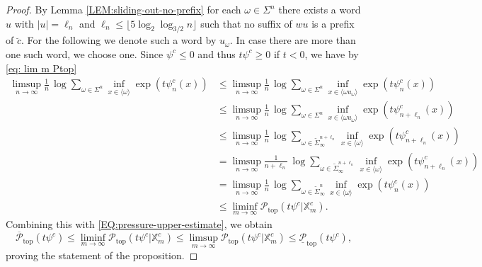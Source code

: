 \documentclass[11pt,reqno]{amsart}
\theoremstyle{plain}
\theoremstyle{definition}
\newcommand{\mc}{\mathcal}
\begin{document}
\begin{proof}
By Lemma \ref{LEM:sliding-out-no-prefix} 
for each $\omega\in \Sigma^n$ there exists a word $u$ with 
$|u|= \ell_n$ and $\ell_n\leqslant \lfloor  5 \log_2 \log_{3/2} n\rfloor$
such that no suffix of $wu$ is a prefix of $\breve{c}$. For the following we denote such a word by $u_{\omega}$. In case there are more than one such word, we choose one. 
Since $\psi^c\leqslant 0$ and thus $t\psi^c\geqslant 0$ if $t<0$, we have by \eqref{eq: lim m Ptop}
\begin{align*}
  \limsup_{n \to \infty} \frac{1}{n}\, \log \sum_{\omega\in \Sigma^{n}}\inf_{x\in  \langle\omega\rangle}\exp\left(t \psi_{n}^{c}(x)\right)
  &\leqslant \limsup_{n \to \infty} \frac{1}{n}\, \log \sum_{\omega\in \Sigma^{n}}\inf_{x\in  \langle\omega u_{\omega}\rangle}\exp\left(t \psi_{n}^{c}(x)\right) \\
  &\leqslant \limsup_{n \to \infty} \frac{1}{n}\, \log \sum_{\omega\in \Sigma^{n}}\inf_{x\in  \langle\omega u_{\omega}\rangle}\exp\left(t \psi_{n+\ell_n}^{c}(x)\right) \\
  &\leqslant \limsup_{n \to \infty} \frac{1}{n}\, \log \sum_{\omega\in \widetilde{\Sigma}_{\infty}^{n+\ell_n}}\inf_{x\in  \langle\omega \rangle}\exp\left(t \psi_{n+\ell_n}^{c}(x)\right) \\
  &= \limsup_{n \to \infty} \frac{1}{n+\ell_n}\, \log \sum_{\omega\in \widetilde{\Sigma}_{\infty}^{n+\ell_n}}\inf_{x\in  \langle\omega \rangle}\exp\left(t \psi_{n+\ell_n}^{c}(x)\right)\\
  &= \limsup_{n \to \infty} \frac{1}{n}\, \log \sum_{\omega\in \widetilde{\Sigma}_{\infty}^{n}}\inf_{x\in  \langle\omega \rangle}\exp\left(t \psi_{n}^{c}(x)\right)
  \\ &\leqslant \liminf_{m \to \infty} \mc P_{\operatorname{top}}(t \psi^c \vert \mathbb{X}_m^c).
\end{align*}
Combining this with \eqref{EQ:pressure-upper-estimate}, we obtain
\[
\overline{\mc P}_{\operatorname{top}}(t \psi^c)
\leqslant \liminf_{m \to \infty} \mc P_{\operatorname{top}}(t \psi^c | \mathbb{X}_m^c)
\leqslant \limsup_{m \to \infty} \mc P_{\operatorname{top}}(t \psi^c | \mathbb{X}_m^c)
\leqslant \underline{\mc P}_{\operatorname{top}}(t \psi^c),
\]
proving the statement of the proposition. 
\end{proof}
\end{document}
